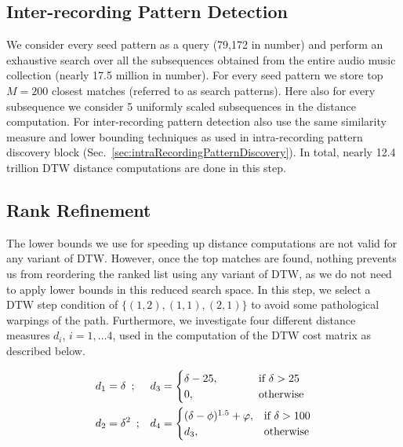 \subsection{Inter-recording Pattern Detection}
\label{sec:patternSearch}


We consider every seed pattern as a query (79,172 in number) and perform an exhaustive search over all the subsequences obtained from the entire audio music collection (nearly 17.5 million in number). For every seed pattern we store top $M=200$ closest matches (referred to as search patterns). Here also for every subsequence we consider 5 uniformly  scaled subsequences in the distance computation. For inter-recording pattern detection also use the same similarity measure and lower bounding techniques as used in intra-recording pattern discovery block (Sec.~\ref{sec:intraRecordingPatternDiscovery}). In total, nearly 12.4 trillion DTW distance computations are done in this step.



\subsection{Rank Refinement}
\label{sec:rankRefinement}

The lower bounds we use for speeding up distance computations are not valid for any variant of DTW. However, once the top matches are found, nothing prevents us from reordering the ranked list using any variant of DTW, as we do not need to apply lower bounds in this reduced search space. In this step, we select a DTW step condition of $\lbrace(1,2), (1,1), (2,1)\rbrace$ to avoid some pathological warpings of the path. Furthermore, we investigate four different distance measures $d_i$, $i=1,\dots 4$, used in the computation of the DTW cost matrix as described below. %

\begin{equation}
\begin{aligned}
d_1& = \delta \hspace{.5em};&
d_3& = 
\begin{cases}
\delta-25, & \hspace{1cm} \text{if } \delta >25\\
0, & \hspace{1cm}\text{otherwise } 
\end{cases}
\\
d_2& = \delta^2 \hspace{.5em};&
d_4 &= 
\begin{cases}
(\delta-\phi)^{1.5} + \varphi, & \text{if } \delta >100\\
d_3, & \text{otherwise}
\end{cases}
\end{aligned}
\label{eq:distances}
\end{equation}



